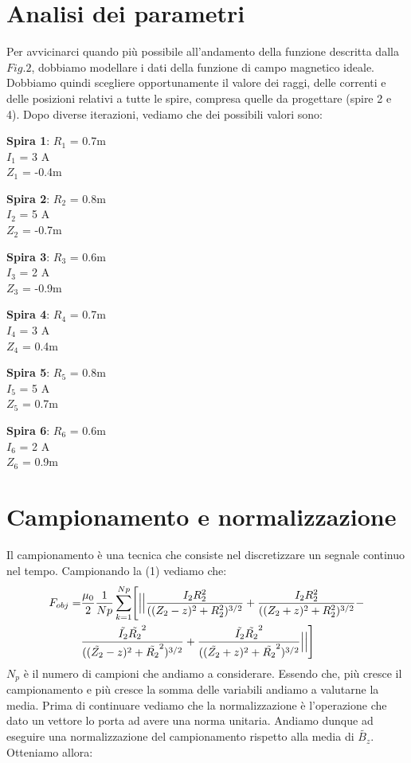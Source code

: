 \documentclass[a4paper, 11pt]{article}
\begin{document}
\section*{Analisi dei parametri}


Per avvicinarci quando più possibile all'andamento della funzione descritta
dalla $Fig.2$, dobbiamo modellare i dati della funzione di campo magnetico ideale.
Dobbiamo quindi scegliere opportunamente il valore dei raggi, delle correnti e
delle posizioni relativi a tutte le spire, compresa quelle da progettare (spire
2 e 4). 
Dopo diverse iterazioni, vediamo che dei possibili valori sono:
\newline  \\
\centerline{ \textbf{Spira 1}: $R_{1}$ = 0.7m \\ $I_{1}$ = 3 A \\ $Z_{1}$ = -0.4m} 
\centerline{ \textbf{Spira 2}: $R_{2}$ = 0.8m \\ $I_{2}$ = 5 A \\ $Z_{2}$ = -0.7m}
\centerline{ \textbf{Spira 3}: $R_{3}$ = 0.6m \\ $I_{3}$ = 2 A \\ $Z_{3}$ = -0.9m}
\centerline{ \textbf{Spira 4}: $R_{4}$ = 0.7m \\ $I_{4}$ = 3 A \\ $Z_{4}$ = 0.4m}
\centerline{ \textbf{Spira 5}: $R_{5}$ = 0.8m \\ $I_{5}$ = 5 A \\ $Z_{5}$ = 0.7m}
\centerline{ \textbf{Spira 6}: $R_{6}$ = 0.6m \\ $I_{6}$ = 2 A \\ $Z_{6}$ = 0.9m}


\section*{Campionamento e normalizzazione}

Il campionamento è una tecnica che consiste nel discretizzare un segnale
continuo nel tempo. Campionando la (1) vediamo che: \\

\begin{equation}
	\begin{split}
		F_{obj} = 
		& \frac{\mu_{0}}{2} \frac{1}{Np} \sum\limits_{k=1}^{Np} \Biggl[\Bigl|\Bigl|\frac{I_{2}R_{2}^{2}}{((Z_{2}-z)^{2}+R_{2}^{2})^{3/2}}+\frac{I_{2}R_{2}^{2}}{((Z_{2}+z)^{2}+R_{2}^{2})^{3/2}}- \\
		& \frac{\tilde{I_{2}}\tilde{R_{2}}^{2}}{((\tilde{Z_{2}}-z)^{2}+\tilde{R_{2}}^{2})^{3/2}}+\frac{\tilde{I_{2}}\tilde{R_{2}}^{2}}{((\tilde{Z_{2}}+z)^{2}+\tilde{R_{2}}^{2})^{3/2}}\Bigr|\Bigr|\Biggr]
	\end{split} 
\end{equation}
\noindent
$N_{p}$ è il numero di campioni che andiamo a considerare. Essendo che, più
cresce il campionamento e più cresce la somma delle variabili andiamo a
valutarne la media. Prima di continuare vediamo che la normalizzazione è
l'operazione che dato un vettore lo porta ad avere una norma unitaria.
Andiamo dunque ad eseguire una normalizzazione del
campionamento rispetto alla media di $\tilde{B_{z}}$. Otteniamo allora: \\
 
\end{document}
